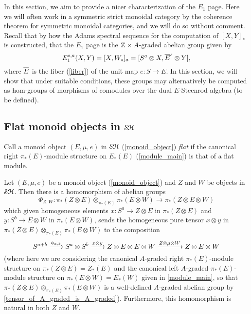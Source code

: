 \documentclass[../main.tex]{subfiles}
\begin{document}
In this section, we aim to provide a nicer characterization of the $E_1$ page. Here we will often work in a symmetric strict monoidal category by the coherence theorem for symmetric monoidal categories, and we will do so without comment. Recall that by how the Adams spectral sequence for the computation of $[X,Y]_*$ is constructed, that the $E_1$ page is the $\mathbb{Z}\times A$-graded abelian group given by
\[E_1^{s,a}(X,Y)=[X,W_s]_a=[S^a\otimes X,{\overline E}^s\otimes Y],\]
where $\overline E$ is the fiber (\autoref{fiber}) of the unit map $e:S\to E$.  In this section, we will show that under suitable conditions, these groups may alternatively be computed as hom-groups of morphisms of comodules over the dual $E$-Steenrod algebra (to be defined).

\subsection{Flat monoid objects in \texorpdfstring{$\mathcal{SH}$}{SH}}

\begin{definition}\label{flat}
    Call a monoid object $(E,\mu,e)$ in $\mathcal{SH}$ (\autoref{monoid_object}) \emph{flat} if the canonical right $\pi_*(E)$-module structure on $E_*(E)$ (\autoref{module_main}) is that of a flat module.
\end{definition}

\begin{proposition}\label{Kunneth_map_construction_main}
    Let $(E,\mu,e)$ be a monoid object (\autoref{monoid_object}) and $Z$ and $W$ be objects in $\mathcal{SH}$. Then there is a homomorphism of abelian groups
    \[\Phi_{Z,W}:\pi_*(Z\otimes E)\otimes_{\pi_*(E)}\pi_*(E\otimes W)\to\pi_*(Z\otimes E\otimes W)\]
    which given homogeneous elements $x:S^a\to Z\otimes E$ in $\pi_*(Z\otimes E)$  and $y:S^b\to E\otimes W$ in $\pi_*(E\otimes W)$, sends the homogeneous pure tensor $x\otimes y$ in $\pi_*(Z\otimes E)\otimes_{\pi_*(E)}\pi_*(E\otimes W)$ to the composition
    \[S^{a+b}\xrightarrow{\phi_{a,b}}S^a\otimes S^b\xrightarrow{x\otimes y}Z\otimes E\otimes E\otimes W\xrightarrow{Z\otimes\mu\otimes W}Z\otimes E\otimes W\]
    (where here we are considering the canonical $A$-graded right $\pi_*(E)$-module structure on $\pi_*(Z\otimes E)=Z_*(E)$ and the canonical left $A$-graded $\pi_*(E)$-module structure on $\pi_*(E\otimes W)=E_*(W)$ given in \autoref{module_main}, so that $\pi_*(Z\otimes E)\otimes_{\pi_*(E)}\pi_*(E\otimes W)$ is a well-defined $A$-graded abelian group by \autoref{tensor_of_A_graded_is_A_graded}). Furthermore, this homomorphism is natural in both $Z$ and $W$.
\end{proposition}
\end{document}
